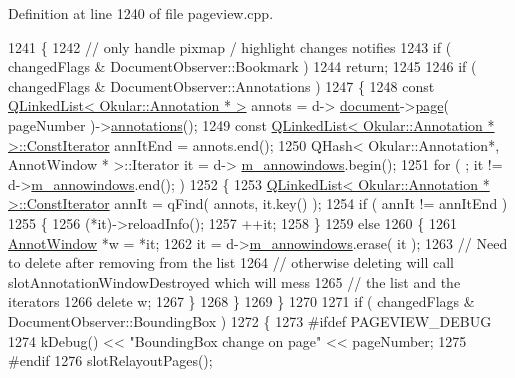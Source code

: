Definition at line 1240 of file pageview.\+cpp.


\begin{DoxyCode}
1241 \{
1242     \textcolor{comment}{// only handle pixmap / highlight changes notifies}
1243     \textcolor{keywordflow}{if} ( changedFlags & DocumentObserver::Bookmark )
1244         \textcolor{keywordflow}{return};
1245 
1246     \textcolor{keywordflow}{if} ( changedFlags & DocumentObserver::Annotations )
1247     \{
1248         \textcolor{keyword}{const} \hyperlink{classQLinkedList}{QLinkedList< Okular::Annotation * >} annots = d->
      \hyperlink{classPageViewPrivate_a50645b9853306cffd74e51efb677e5b4}{document}->\hyperlink{classOkular_1_1Document_a1c95c2f192d739c217d00971da48f69d}{page}( pageNumber )->\hyperlink{classOkular_1_1Page_ad82e0f26d5435b5ccfa3d23c359ac23c}{annotations}();
1249         \textcolor{keyword}{const} \hyperlink{classQLinkedList}{QLinkedList< Okular::Annotation * >::ConstIterator}
       annItEnd = annots.end();
1250         QHash< Okular::Annotation*, AnnotWindow * >::Iterator it = d->
      \hyperlink{classPageViewPrivate_adb8fb9cfc6f045acbbe4cb534003adb2}{m\_annowindows}.begin();
1251         \textcolor{keywordflow}{for} ( ; it != d->\hyperlink{classPageViewPrivate_adb8fb9cfc6f045acbbe4cb534003adb2}{m\_annowindows}.end(); )
1252         \{
1253             \hyperlink{classQLinkedList}{QLinkedList< Okular::Annotation * >::ConstIterator}
       annIt = qFind( annots, it.key() );
1254             \textcolor{keywordflow}{if} ( annIt != annItEnd )
1255             \{
1256                 (*it)->reloadInfo();
1257                 ++it;
1258             \}
1259             \textcolor{keywordflow}{else}
1260             \{
1261                 \hyperlink{classAnnotWindow}{AnnotWindow} *w = *it;
1262                 it = d->\hyperlink{classPageViewPrivate_adb8fb9cfc6f045acbbe4cb534003adb2}{m\_annowindows}.erase( it );
1263                 \textcolor{comment}{// Need to delete after removing from the list}
1264                 \textcolor{comment}{// otherwise deleting will call slotAnnotationWindowDestroyed which will mess}
1265                 \textcolor{comment}{// the list and the iterators}
1266                 \textcolor{keyword}{delete} w;
1267             \}
1268         \}
1269     \}
1270 
1271     \textcolor{keywordflow}{if} ( changedFlags & DocumentObserver::BoundingBox )
1272     \{
1273 \textcolor{preprocessor}{#ifdef PAGEVIEW\_DEBUG}
1274         kDebug() << \textcolor{stringliteral}{"BoundingBox change on page"} << pageNumber;
1275 \textcolor{preprocessor}{#endif}
1276         slotRelayoutPages();

\end{DoxyCode}
